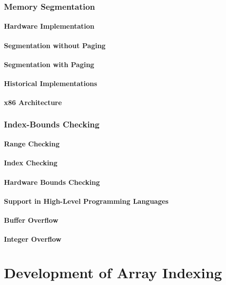 \documentclass[12pt, oneside]{book}
\begin{document}
\subsection{Memory Segmentation}
\subsubsection{Hardware Implementation}
\subsubsection{Segmentation without Paging}
\subsubsection{Segmentation with Paging}
\subsubsection{Historical Implementations}
\subsubsection{x86 Architecture}
\subsection{Index-Bounds Checking}
\subsubsection{Range Checking}
\subsubsection{Index Checking}
\subsubsection{Hardware Bounds Checking}
\subsubsection{Support in High-Level Programming Languages}
\subsubsection{Buffer Overflow}
\subsubsection{Integer Overflow}
\chapter{Development of Array Indexing}
\end{document}
